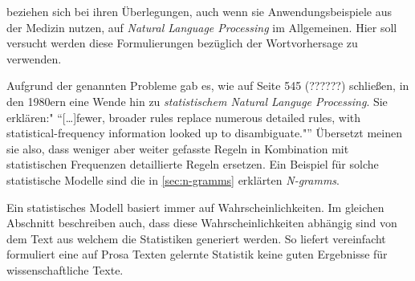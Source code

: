         \cite{jamia:introduction} beziehen sich bei ihren Überlegungen, auch wenn sie Anwendungsbeispiele aus der Medizin nutzen, auf \emph{Natural Language Processing} im Allgemeinen. Hier soll versucht werden diese Formulierungen bezüglich der Wortvorhersage zu verwenden.
        
        Aufgrund der genannten Probleme gab es, wie \cite{jamia:introduction} auf Seite 545  (??????)  schließen, in den 1980ern eine Wende hin zu \emph{statistischem Natural Languge Processing}. Sie erklären:" \enquote{[\dots]fewer, broader rules replace numerous detailed rules, with statistical-frequency information looked up to disambiguate."} Übersetzt meinen sie also, dass weniger aber weiter gefasste Regeln in Kombination mit statistischen Frequenzen detaillierte Regeln ersetzen. Ein Beispiel für solche statistische Modelle sind die in \autoref{sec:n-gramms} erklärten \emph{N-gramms}.
        
        Ein statistisches Modell basiert immer auf Wahrscheinlichkeiten. Im gleichen Abschnitt beschreiben \cite{jamia:introduction} auch, dass diese Wahrscheinlichkeiten abhängig sind von dem Text aus welchem die Statistiken generiert werden. So liefert vereinfacht formuliert eine auf Prosa Texten gelernte Statistik keine guten Ergebnisse für wissenschaftliche Texte.

